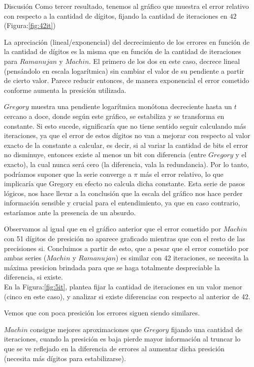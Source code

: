 \begin{section}{Discusión}
	Como tercer resultado, tenemos al gráfico que muestra el error relativo con respecto a la cantidad de dígitos, fijando la cantidad de iteraciones en $42$ (Figura:\ref{fig:42it})
	
	La apreciación (lineal/exponencial) del decrecimiento de los errores en función de la cantidad de dígitos es la misma que en función de la cantidad de iteraciones para $Ramanujan$ y $Machin$. El primero de los dos en este caso, decrece lineal (pensándolo en escala logarítmica) sin cambiar el valor de su pendiente a partir de cierto valor. Parece reducir entonces, de manera exponencial el error cometido conforme aumenta la presición utilizada.
	
	$Gregory$ muestra una pendiente logarítmica monótona decreciente hasta un $t$ cercano a doce, donde según este gráfico, se estabiliza y se transforma en constante. Si esto sucede, significaría que no tiene sentido seguir calculando más iteraciones, ya que el error de estos dígitos no van a mejorar con respecto al valor exacto de la constante a calcular, es decir, si al variar la cantidad de bits el error no disminuye, entonces existe al menos un bit con diferencia (entre $Gregory$ y el exacto), la cual nunca será cero (la diferencia, vala la redundancia). Por lo tanto, podríamos suponer que la serie converge a $\pi$ más el error relativo, lo que implicaría que Gregory en efecto no calcula dicha constante. Esta serie de pasos lógicos, nos hace llevar a la conclusión que la escala del gráfico nos hace perder información sensible y crucial para el entendimiento, ya que en caso contrario, estaríamos ante la presencia de un absurdo.
	
	Observamos al igual que en el gráfico anterior que el error cometido por $Machin$ con 51 dígitos de presición no aparece graficado mientras que con el resto de las precisiones si. Concluimos a partir de esto, que a pesar que el error cometido por ambas series ($Machin$ y $Ramanujan$) es similar con 42 iteraciones, se necesita la máxima presicion brindada para que se haga totalmente despreciable la diferencia, si existe.\\
	
	En la Figura:\ref{fig:5it}, plantea fijar la cantidad de iteraciones en un valor menor (cinco en este caso), y analizar si existe diferencias con respecto al anterior de 42.
	
	Vemos que con poca presición los errores siguen siendo similares.
	
	$Machin$ consigue mejores aproximaciones que $Gregory$ fijando una cantidad de iteraciones, cuando la presición es baja pierde mayor información al truncar lo que se ve reflejado en la diferencia de errores al aumentar dicha presición (necesita más dígitos para estabilizarse).
	

\end{section}
